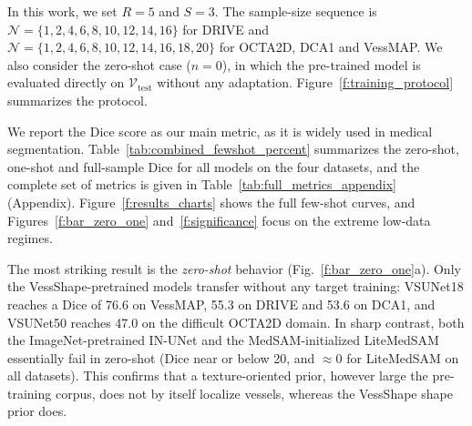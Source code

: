 \documentclass[twocolumn]{article}
\begin{document}
In this work, we set $R=5$ and $S=3$. The sample-size sequence is $\mathcal{N}=\{1,2,4,6,8,10,12,14,16\}$ for DRIVE and $\mathcal{N}=\{1,2,4,6,8,10,12,14,16,18,20\}$ for OCTA2D, DCA1 and VessMAP. We also consider the zero-shot case ($n=0$), in which the pre-trained model is evaluated directly on $\mathcal{V}_{\text{test}}$ without any adaptation. Figure~\ref{f:training_protocol} summarizes the protocol.




We report the Dice score as our main metric, as it is widely used in medical segmentation. Table~\ref{tab:combined_fewshot_percent} summarizes the zero-shot, one-shot and full-sample Dice for all models on the four datasets, and the complete set of metrics is given in Table~\ref{tab:full_metrics_appendix} (Appendix). Figure~\ref{f:results_charts} shows the full few-shot curves, and Figures~\ref{f:bar_zero_one} and~\ref{f:significance} focus on the extreme low-data regimes.

The most striking result is the \emph{zero-shot} behavior (Fig.~\ref{f:bar_zero_one}a). Only the VessShape-pretrained models transfer without any target training: VSUNet18 reaches a Dice of 76.6 on VessMAP, 55.3 on DRIVE and 53.6 on DCA1, and VSUNet50 reaches 47.0 on the difficult OCTA2D domain. In sharp contrast, both the ImageNet-pretrained IN-UNet and the MedSAM-initialized LiteMedSAM essentially fail in zero-shot (Dice near or below 20, and $\approx$0 for LiteMedSAM on all datasets). This confirms that a texture-oriented prior, however large the pre-training corpus, does not by itself localize vessels, whereas the VessShape shape prior does.
\end{document}
